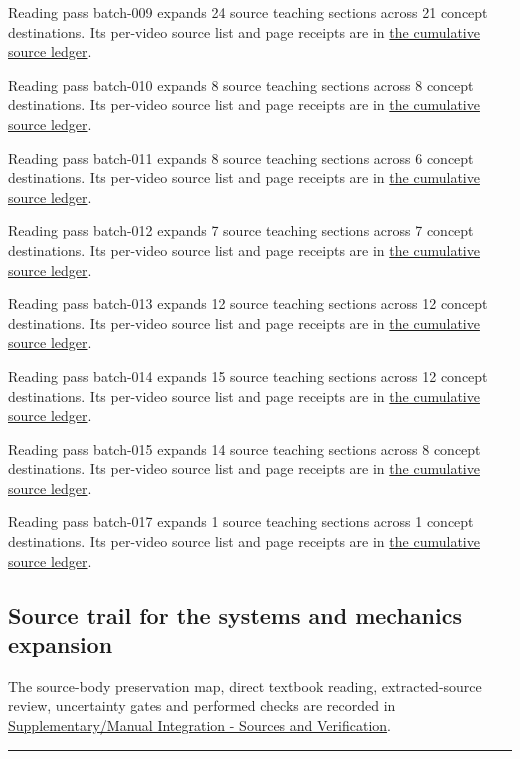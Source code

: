 Reading pass batch-009 expands 24 source teaching sections across 21 concept destinations. Its per-video source list and page receipts are in \hyperref[appendix-877738f6f4d2]{the cumulative source ledger}.

Reading pass batch-010 expands 8 source teaching sections across 8 concept destinations. Its per-video source list and page receipts are in \hyperref[appendix-877738f6f4d2]{the cumulative source ledger}.

Reading pass batch-011 expands 8 source teaching sections across 6 concept destinations. Its per-video source list and page receipts are in \hyperref[appendix-877738f6f4d2]{the cumulative source ledger}.

Reading pass batch-012 expands 7 source teaching sections across 7 concept destinations. Its per-video source list and page receipts are in \hyperref[appendix-877738f6f4d2]{the cumulative source ledger}.

Reading pass batch-013 expands 12 source teaching sections across 12 concept destinations. Its per-video source list and page receipts are in \hyperref[appendix-877738f6f4d2]{the cumulative source ledger}.

Reading pass batch-014 expands 15 source teaching sections across 12 concept destinations. Its per-video source list and page receipts are in \hyperref[appendix-877738f6f4d2]{the cumulative source ledger}.

Reading pass batch-015 expands 14 source teaching sections across 8 concept destinations. Its per-video source list and page receipts are in \hyperref[appendix-877738f6f4d2]{the cumulative source ledger}.

Reading pass batch-017 expands 1 source teaching sections across 1 concept destinations. Its per-video source list and page receipts are in \hyperref[appendix-877738f6f4d2]{the cumulative source ledger}.

\subsection{Source trail for the systems and mechanics expansion}\label{source-trail-for-the-systems-and-mechanics-expansion}

The source-body preservation map, direct textbook reading, extracted-source review, uncertainty gates and performed checks are recorded in \hyperref[appendix-3b67654799a2]{Supplementary/Manual Integration - Sources and Verification}.

\begin{center}\rule{0.5\linewidth}{0.5pt}\end{center}

